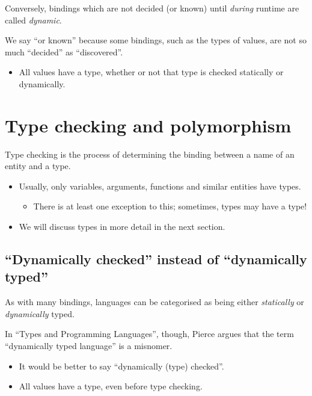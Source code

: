 \documentclass[11pt]{article}
\theoremstyle{definition}
\begin{document}
Conversely, bindings which are not decided (or known) until \emph{during} runtime
are called \emph{dynamic}.

We say “or known” because some bindings, such as the types of values,
are not so much “decided” as “discovered”.
\begin{itemize}
\item All values have a type, whether or not that type is checked
statically or dynamically.
\end{itemize}

\section{Type checking and polymorphism}
\label{sec:org051166b}
Type checking is the process of determining
the binding between a name of an entity and a type.
\begin{itemize}
\item Usually, only variables, arguments, functions and similar entities
have types.
\begin{itemize}
\item There is at least one exception to this;
sometimes, types may have a type!
\end{itemize}
\item We will discuss types in more detail in the next section.
\end{itemize}

\subsection{“Dynamically checked” instead of “dynamically typed”}
\label{sec:orgbe6df73}
As with many bindings, languages can be categorised as
being either \emph{statically} or \emph{dynamically} typed.

In “Types and Programming Languages”, though, Pierce argues
that the term “dynamically typed language” is a misnomer.
\begin{itemize}
\item It would be better to say “dynamically (type) checked”.
\item All values have a type, even before type checking.
\end{itemize}
\end{document}
